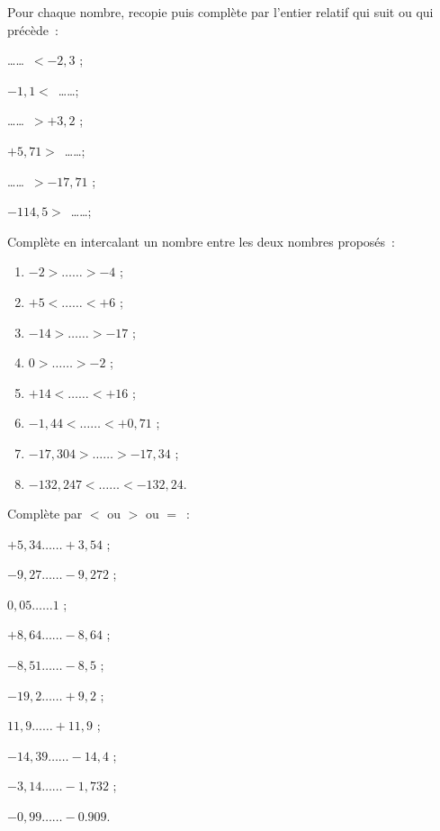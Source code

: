 \begin{exercice}
Pour chaque nombre, recopie puis complète par l'entier relatif qui suit ou qui précède :
\begin{colenumerate}{2}
 \item \ldots \ldots $< -2,3$ ;
 \item $-1,1 <$ \ldots \ldots ;
 \item \ldots \ldots $> +3,2$ ;
 \item $+5,71 >$ \ldots \ldots ;
 \item \ldots \ldots $> -17,71$ ;
 \item $-114,5 >$ \ldots \ldots ;
 \end{colenumerate}	
\end{exercice}



\newpage 


\begin{exercice}
Complète en intercalant un nombre entre les deux nombres proposés :
\begin{enumerate}
 \item $-2 > \ldots \ldots > -4$ ;
 \item $+5 < \ldots \ldots < +6$ ;
 \item $-14 > \ldots \ldots > -17$ ;
 \item $0 > \ldots \ldots > -2$ ;
 \item $+14 < \ldots \ldots < +16$ ;
 \item $-1,44 < \ldots \ldots < +0,71$ ;
 \item $-17,304 > \ldots \ldots > -17,34$ ;
 \item $-132,247 < \ldots \ldots < -132,24$.
 \end{enumerate}
\end{exercice}


\begin{exercice}
Complète par $<$ ou $>$ ou $=$ :
\begin{colitemize}{2}
 \item $+5,34 \ldots \ldots +3,54$ ;
 \item $-9,27 \ldots \ldots -9,272$ ;
 \item $0,05 \ldots \ldots 1$ ;
 \item $+8,64 \ldots \ldots -8,64$ ;
 \item $-8,51 \ldots \ldots -8,5$ ;
 \item $-19,2 \ldots \ldots +9,2$ ;
 \item $11,9 \ldots \ldots +11,9$ ;
 \item $-14,39 \ldots \ldots -14,4$ ;
 \item $-3,14 \ldots \ldots -1,732$ ;
 \item $-0,99 \ldots \ldots -0.909$.
 \end{colitemize}
\end{exercice}



